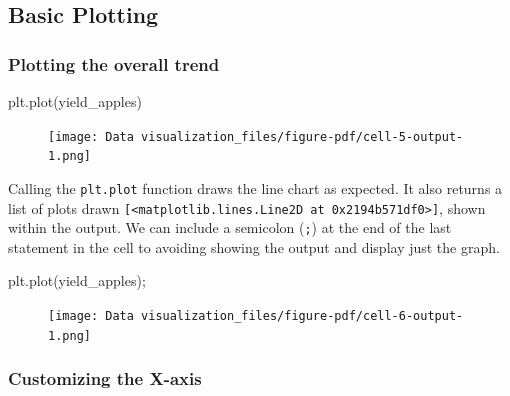 \documentclass[
  letterpaper,
  DIV=11,
  numbers=noendperiod]{scrreprt}
\newenvironment{Shaded}{\begin{snugshade}}{\end{snugshade}}
\newcommand{\NormalTok}[1]{\textcolor[rgb]{0.00,0.23,0.31}{#1}}
\newcommand{\OperatorTok}[1]{\textcolor[rgb]{0.37,0.37,0.37}{#1}}
\begin{document}
\hypertarget{basic-plotting}{%
\subsection{Basic Plotting}\label{basic-plotting}}

\hypertarget{plotting-the-overall-trend}{%
\subsubsection{Plotting the overall
trend}\label{plotting-the-overall-trend}}

\begin{Shaded}
\begin{Highlighting}[]
\NormalTok{plt.plot(yield\_apples)}
\end{Highlighting}
\end{Shaded}

\begin{figure}[H]

{\centering \texttt{[image: Data visualization\_files/figure-pdf/cell-5-output-1.png]}

}

\end{figure}

Calling the \texttt{plt.plot} function draws the line chart as expected.
It also returns a list of plots drawn
\texttt{{[}\textless{}matplotlib.lines.Line2D\ at\ 0x2194b571df0\textgreater{}{]}},
shown within the output. We can include a semicolon (\texttt{;}) at the
end of the last statement in the cell to avoiding showing the output and
display just the graph.

\begin{Shaded}
\begin{Highlighting}[]
\NormalTok{plt.plot(yield\_apples)}\OperatorTok{;}
\end{Highlighting}
\end{Shaded}

\begin{figure}[H]

{\centering \texttt{[image: Data visualization\_files/figure-pdf/cell-6-output-1.png]}

}

\end{figure}

\hypertarget{customizing-the-x-axis}{%
\subsubsection{Customizing the X-axis}\label{customizing-the-x-axis}}
\end{document}
